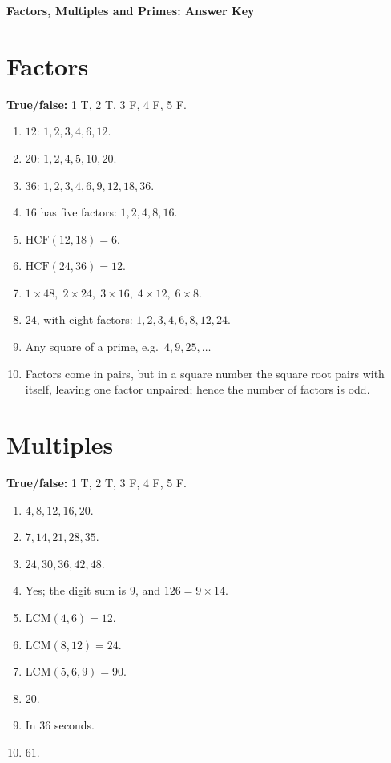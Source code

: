 \documentclass{article}
\begin{document}
\begin{center}
{\LARGE\bfseries Factors, Multiples and Primes: Answer Key}
\end{center}

\section*{Factors}
\textbf{True/false:} 1 T, 2 T, 3 F, 4 F, 5 F.

\begin{enumerate}[label=\arabic*., nosep, leftmargin=*]
\item \(12\): \(1,2,3,4,6,12\).
\item \(20\): \(1,2,4,5,10,20\).
\item \(36\): \(1,2,3,4,6,9,12,18,36\).
\item \(16\) has five factors: \(1,2,4,8,16\).
\item \(\mathrm{HCF}(12,18)=6\).
\item \(\mathrm{HCF}(24,36)=12\).
\item \(1\times48,\;2\times24,\;3\times16,\;4\times12,\;6\times8\).
\item \(24\), with eight factors: \(1,2,3,4,6,8,12,24\).
\item Any square of a prime, e.g.\ \(4,9,25,\dots\)
\item Factors come in pairs, but in a square number the square root pairs with itself, leaving one factor unpaired; hence the number of factors is odd.
\end{enumerate}

\section*{Multiples}
\textbf{True/false:} 1 T, 2 T, 3 F, 4 F, 5 F.

\begin{enumerate}[label=\arabic*., nosep, leftmargin=*]
\item \(4,8,12,16,20\).
\item \(7,14,21,28,35\).
\item \(24,30,36,42,48\).
\item Yes; the digit sum is \(9\), and \(126=9\times14\).
\item \(\mathrm{LCM}(4,6)=12\).
\item \(\mathrm{LCM}(8,12)=24\).
\item \(\mathrm{LCM}(5,6,9)=90\).
\item \(20\).
\item In \(36\) seconds.
\item \(61\).
\end{enumerate}
\end{document}
